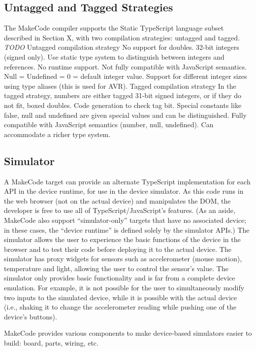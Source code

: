 \subsection{Untagged and Tagged Strategies}

The MakeCode compiler supports the Static TypeScript language subset described in Section X, with two compilation
strategies: untagged and tagged. 
\emph{TODO}
Untagged compilation strategy
No support for doubles. 32-bit integers (signed only). Use static type system to distinguish between integers and references.  No runtime support.  Not fully compatible with JavaScript semantics. Null = Undefined = 0 = default integer value.  Support for different integer sizes using type aliases (this is used for AVR). 
Tagged compilation strategy
In the tagged strategy, numbers are either tagged 31-bit signed integers, or if they do not fit, boxed doubles. Code generation to check tag bit. Special constants like false, null and undefined are given special values and can be distinguished. Fully compatible with JavaScript semantics (number, null, undefined).   Can accommodate a richer type system. 

\subsection{Simulator}

A MakeCode target can provide an alternate TypeScript implementation for each API in the device runtime, for use in the device
simulator. As this code runs in the web browser (not on the actual device) and manipulates the DOM, the developer is free to
use all of TypeScript/JavaScript's features. (As an aside, MakeCode also support ``simulator-only'' targets that have no 
associated device; in these cases, the ``device runtime'' is defined solely by the simulator APIs.) 
The simulator allows the user to experience the basic functions of the device in the browser and to test their code
before deploying it to the actual device. The simulator has proxy widgets for sensors such as accelerometer (mouse motion),
temperature and light, allowing the user to control the sensor's value.  The simulator only provides basic functionality
and is far from a complete device emulation.   For example, it is not possible for the user to simultaneously modify two
inputs to the simulated device, while it is possible with the actual device (i.e., shaking it to change the accelerometer
reading while pushing one of the device's buttons).

MakeCode provides various components to make device-based simulators easier to build: board, parts, wiring, etc.

